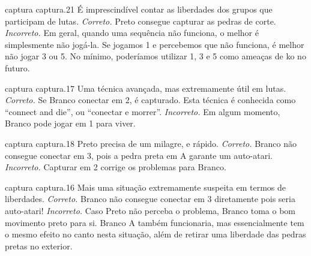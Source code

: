 \problemAnswerDiagram
  {captura}
  {captura.21}
  {É imprescindível contar as liberdades dos grupos que participam de lutas.}
  {\emph{Correto.} Preto consegue capturar as pedras de corte.}
  {\emph{Incorreto.} Em geral, quando uma sequência não funciona, o melhor é simplesmente não jogá-la. Se jogamos 1 e percebemos que não funciona, é melhor não jogar 3 ou 5. No mínimo, poderíamos utilizar 1, 3 e 5 como ameaças de ko no futuro.}

\problemAnswerDiagram
  {captura}
  {captura.17}
  {Uma técnica avançada, mas extremamente útil em lutas.}
  {\emph{Correto.} Se Branco conectar em 2, é capturado. Esta técnica é conhecida como ``connect and die'', ou ``conectar e morrer''.}
  {\emph{Incorreto.} Em algum momento, Branco pode jogar em 1 para viver.}

\problemAnswerDiagram
  {captura}
  {captura.18}
  {Preto precisa de um milagre, e rápido.}
  {\emph{Correto.} Branco não consegue conectar em 3, pois a pedra preta em A garante um auto-atari.}
  {\emph{Incorreto.} Capturar em 2 corrige os problemas para Branco.}

\problemAnswerDiagram
  {captura}
  {captura.16}
  {Mais uma situação extremamente suspeita em termos de liberdades.}
  {\emph{Correto.} Branco não consegue conectar em 3 diretamente pois seria auto-atari!}
  {\emph{Incorreto.} Caso Preto não perceba o problema, Branco toma o bom movimento preto para si. Branco A também funcionaria, mas essencialmente tem o mesmo efeito no canto nesta situação, além de retirar uma liberdade das pedras pretas no exterior.}